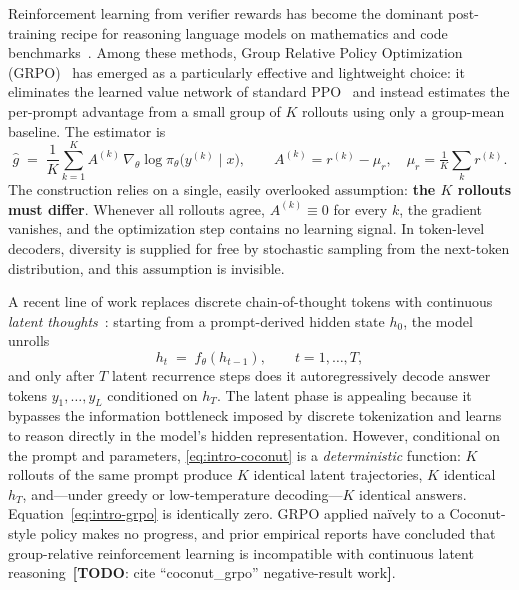 \documentclass[11pt]{article}
\theoremstyle{definition}
\theoremstyle{remark}
\newcommand{\answerTODO}[1][]{{\color{red}\textbf{[TODO}#1\textbf{]}}}
\begin{document}
Reinforcement learning from verifier rewards has become the dominant
post-training recipe for reasoning language models on mathematics and code
benchmarks~\citep{shao2024deepseekmath,yu2024dapo}.  Among these methods,
Group Relative Policy Optimization (GRPO)~\citep{shao2024deepseekmath} has
emerged as a particularly effective and lightweight choice: it eliminates
the learned value network of standard
PPO~\citep{schulman2017ppo} and instead estimates the per-prompt advantage
from a small group of $K$ rollouts using only a group-mean baseline.  The
estimator is
\begin{equation}
\hat g \;=\; \frac{1}{K}\sum_{k=1}^{K} A^{(k)}\,
   \nabla_\theta \log \pi_\theta\!\big(y^{(k)}\mid x\big),
\qquad
A^{(k)} = r^{(k)} - \mu_r,
\quad
\mu_r = \tfrac{1}{K}\sum_{k}r^{(k)}.
\label{eq:intro-grpo}
\end{equation}
The construction relies on a single, easily overlooked assumption:
\textbf{the $K$ rollouts must differ}.  Whenever all rollouts agree,
$A^{(k)} \equiv 0$ for every $k$, the gradient vanishes, and the
optimization step contains no learning signal.  In token-level decoders,
diversity is supplied for free by stochastic sampling from the next-token
distribution, and this assumption is invisible.

A recent line of work replaces discrete chain-of-thought tokens with
continuous \emph{latent thoughts}~\citep{hao2024coconut}: starting from
a prompt-derived hidden state $h_0$, the model unrolls
\begin{equation}
h_t \;=\; f_\theta(h_{t-1}),
\qquad t = 1, \dots, T,
\label{eq:intro-coconut}
\end{equation}
and only after $T$ latent recurrence steps does it autoregressively
decode answer tokens $y_1, \dots, y_L$ conditioned on $h_T$.  The
latent phase is appealing because it bypasses the information bottleneck
imposed by discrete tokenization and learns to reason directly in the
model's hidden representation.  However, conditional on the prompt and
parameters, \eqref{eq:intro-coconut} is a \emph{deterministic} function:
$K$ rollouts of the same prompt produce $K$ identical latent
trajectories, $K$ identical $h_T$, and---under greedy or low-temperature
decoding---$K$ identical answers.  Equation~\eqref{eq:intro-grpo} is
identically zero.  GRPO applied na\"ively to a Coconut-style policy
makes no progress, and prior empirical reports have concluded that
group-relative reinforcement learning is incompatible with continuous
latent reasoning~\answerTODO[: cite ``coconut\_grpo'' negative-result work].
\end{document}
